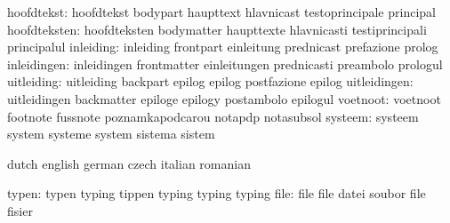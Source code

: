                hoofdtekst: hoofdtekst                bodypart
                           haupttext                 hlavnicast
                           testoprincipale           principal %
             hoofdteksten: hoofdteksten              bodymatter
                           haupttexte                hlavnicasti
                           testiprincipali           principalul %
                inleiding: inleiding                 frontpart
                           einleitung                prednicast
                           prefazione                prolog
              inleidingen: inleidingen               frontmatter
                           einleitungen              prednicasti
                           preambolo                 prologul
               uitleiding: uitleiding                backpart
                           epilog                    epilog
                           postfazione               epilog %
             uitleidingen: uitleidingen              backmatter
                           epiloge                   epilogy
                           postambolo                epilogul %
                 voetnoot: voetnoot                  footnote
                           fussnote                  poznamkapodcarou
                           notapdp                   notasubsol
                  systeem: systeem                   system
                           systeme                   system
                           sistema                   sistem

\stopvariables

\startvariables            dutch                     english
                           german                    czech
                           italian                   romanian

                    typen: typen                     typing
                           tippen                    typing
                           typing                    typing %
                     file: file                      file
                           datei                     soubor
                           file                      fisier

\stopvariables




